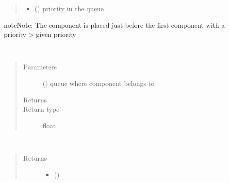 \documentclass[letterpaper,10pt,english]{sphinxmanual}
\begin{document}
\begin{fulllineitems}
\begin{fulllineitems}
\begin{quote}
\begin{description}
\begin{itemize}
\item {} 
 () \textendash{} priority in the queue

\end{itemize}

\end{description}\end{quote}

\begin{sphinxadmonition}{note}{Note:}
The component is placed just before the first component with a priority \textgreater{} given priority
\end{sphinxadmonition}

\end{fulllineitems}


\begin{fulllineitems}
\label{\detokenize{Reference:salabim.Component.enter_time}}~\begin{quote}\begin{description}
\item[{Parameters}] \leavevmode
{} ({\hyperref[\detokenize{Reference:salabim.Queue}]{}}) \textendash{} queue where component belongs to

\item[{Returns}] \leavevmode
{}

\item[{Return type}] \leavevmode
float

\end{description}\end{quote}

\end{fulllineitems}


\begin{fulllineitems}
\label{\detokenize{Reference:salabim.Component.failed}}~\begin{quote}\begin{description}
\item[{Returns}] \leavevmode
\begin{itemize}
\item {} 
 ()


\end{itemize}
\end{description}
\end{quote}
\end{fulllineitems}
\end{fulllineitems}
\end{document}
